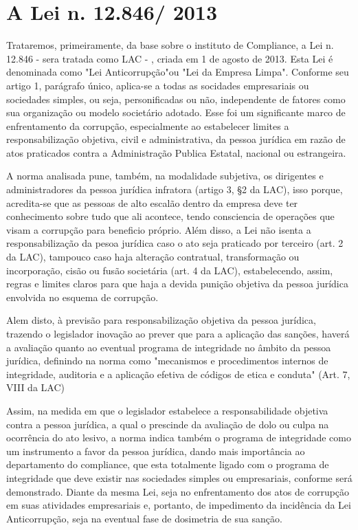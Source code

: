 \chapter{A Lei n. 12.846/ 2013}

Trataremos, primeiramente, da base sobre o instituto de Compliance, a Lei n. 12.846 - sera tratada como LAC - , criada em 1 de agosto de 2013. Esta Lei é denominada como "Lei Anticorrupção"ou "Lei da Empresa Limpa". Conforme seu artigo 1, parágrafo único, aplica-se a todas as socidades empresariais ou sociedades simples, ou seja, personificadas ou não, independente de fatores como sua organização ou modelo societário adotado. Esse foi um significante marco de enfrentamento da corrupção, especialmente ao estabelecer limites a responsabilização objetiva, civil e administrativa, da pessoa jurídica em razão de atos praticados contra a Administração Publica Estatal, nacional ou estrangeira. 

A norma analisada pune, também, na modalidade subjetiva, os dirigentes e administradores da pessoa jurídica infratora (artigo 3, §2 da LAC), isso porque, acredita-se que as pessoas de alto escalão dentro da empresa deve ter conhecimento sobre tudo que ali acontece, tendo consciencia de operações que visam a corrupção para beneficio próprio. Além disso, a Lei não isenta a responsabilização da pesoa jurídica caso o ato seja praticado por terceiro (art. 2 da LAC), tampouco caso haja alteração contratual, transformação ou incorporação, cisão ou fusão societária (art. 4 da LAC), estabelecendo, assim, regras e limites claros para que haja a devida punição objetiva da pessoa jurídica envolvida no esquema de corrupção. 

Alem disto, à previsão para responsabilização objetiva da pessoa jurídica, trazendo o legislador inovação ao prever que para a aplicação das sanções, haverá a avaliação quanto ao eventual programa de integridade no âmbito da pessoa jurídica, definindo na norma como "mecanismos e procedimentos internos de integridade, auditoria e a aplicação efetiva de códigos de etica e conduta" (Art. 7, VIII da LAC)

Assim, na medida em que o legislador estabelece a responsabilidade objetiva contra a pessoa jurídica, a qual o prescinde da avaliação de dolo ou culpa na ocorrência do ato lesivo, a norma indica também o programa de integridade como um instrumento a favor da pessoa jurídica, dando mais importância ao departamento do compliance, que esta totalmente ligado com o programa de integridade que deve existir nas sociedades simples ou empresariais, conforme será demonstrado. Diante da mesma Lei, seja no enfrentamento dos atos de corrupção em suas atividades empresariais e, portanto, de impedimento da incidência da Lei Anticorrupção, seja na eventual fase de dosimetria de sua sanção. 

